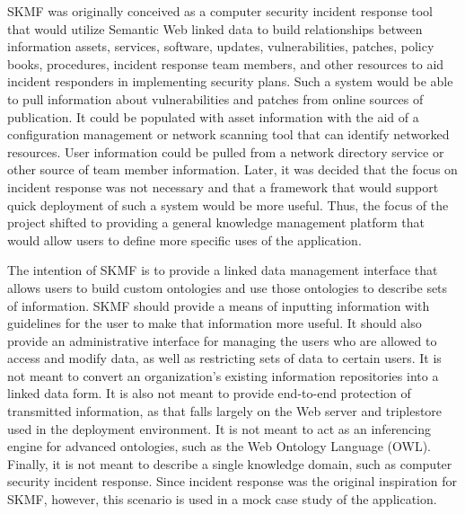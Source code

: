 SKMF was originally conceived as a computer security incident response tool that would utilize Semantic Web linked data to build relationships between information assets, services, software, updates, vulnerabilities, patches, policy books, procedures, incident response team members, and other resources to aid incident responders in implementing security plans. Such a system would be able to pull information about vulnerabilities and patches from online sources of publication. It could be populated with asset information with the aid of a configuration management or network scanning tool that can identify networked resources. User information could be pulled from a network directory service or other source of team member information. Later, it was decided that the focus on incident response was not necessary and that a framework that would support quick deployment of such a system would be more useful. Thus, the focus of the project shifted to providing a general knowledge management platform that would allow users to define more specific uses of the application.

The intention of SKMF is to provide a linked data management interface that allows users to build custom ontologies and use those ontologies to describe sets of information. SKMF should provide a means of inputting information with guidelines for the user to make that information more useful. It should also provide an administrative interface for managing the users who are allowed to access and modify data, as well as restricting sets of data to certain users. It is not meant to convert an organization's existing information repositories into a linked data form. It is also not meant to provide end-to-end protection of transmitted information, as that falls largely on the Web server and triplestore used in the deployment environment. It is not meant to act as an inferencing engine for advanced ontologies, such as the Web Ontology Language
\cite{owl}
(OWL). Finally, it is not meant to describe a single knowledge domain, such as computer security incident response. Since incident response was the original inspiration for SKMF, however, this scenario is used in a mock case study of the application.
